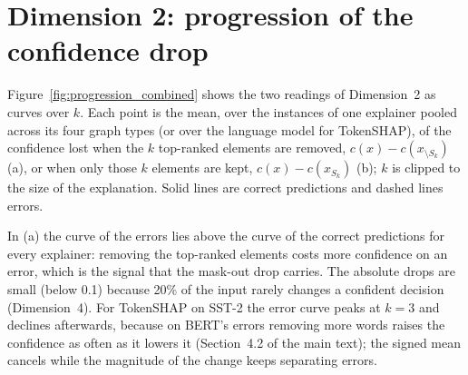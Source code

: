 \documentclass[review,12pt]{elsarticle}
\begin{document}
\begin{table}[H]
\centering
\scriptsize
\setlength{\tabcolsep}{4pt}
\caption{Seed replicates of the distilled and of the gold-trained surrogate (same graphs, node features, architecture and protocol; different random seed), against BERT's gold-label errors on the test split: accuracy with respect to the gold labels, agreement with BERT's predictions, fraction of BERT's errors that the surrogate also makes, Jaccard index of the two error sets, and fraction of BERT's errors on which the surrogate is confident (\(>0.9\)) and agrees with BERT.}
\label{tab:seed_replicates}
\end{table}

\clearpage
\section{Dimension 2: progression of the confidence drop}

Figure~\ref{fig:progression_combined} shows the two readings of Dimension~2 as curves over \(k\). Each point is the mean, over the instances of one explainer pooled across its four graph types (or over the language model for TokenSHAP), of the confidence lost when the \(k\) top-ranked elements are removed, \(c(x)-c(x_{\setminus S_k})\) (a), or when only those \(k\) elements are kept, \(c(x)-c(x_{S_k})\) (b); \(k\) is clipped to the size of the explanation. Solid lines are correct predictions and dashed lines errors.

In (a) the curve of the errors lies above the curve of the correct predictions for every explainer: removing the top-ranked elements costs more confidence on an error, which is the signal that the mask-out drop carries. The absolute drops are small (below 0.1) because 20\% of the input rarely changes a confident decision (Dimension~4). For TokenSHAP on SST-2 the error curve peaks at \(k=3\) and declines afterwards, because on BERT's errors removing more words raises the confidence as often as it lowers it (Section~4.2 of the main text); the signed mean cancels while the magnitude of the change keeps separating errors.
\end{document}
